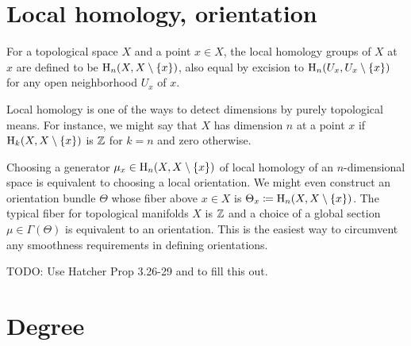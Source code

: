 \section{Local homology, orientation}

\begin{defn}
    For a topological space $X$ and a point $x\in X$, the local homology groups of $X$ at $x$ are defined to be $\mathrm{H}_n(X,X\setminus\{x\})$, also equal by excision to $\mathrm{H}_n(U_x,U_x\setminus\{x\})$ for any open neighborhood $U_x$ of $x$.
\end{defn}

\begin{rem}
    Local homology is one of the ways to detect dimensions by purely topological means. For instance, we might say that $X$ has dimension $n$ at a point $x$ if $\mathrm{H}_k(X,X\setminus\{x\})$ is $\mathbb{Z}$ for $k=n$ and zero otherwise.
    
    Choosing a generator $\mu_x\in \mathrm{H}_n(X,X\setminus\{x\}) $ of local homology of an $n$-dimensional space is equivalent to choosing a local orientation. We might even construct an orientation bundle $\Theta$ whose fiber above $x\in X$ is $\Theta_x\coloneqq \mathrm{H}_n(X,X\setminus\{x\})$. The typical fiber for topological manifolds $X$ is $\mathbb{Z}$ and a choice of a global section $\mu\in\Gamma(\Theta)$ is equivalent to an orientation. This is the easiest way to circumvent any smoothness requirements in defining orientations.
\end{rem}

TODO: Use Hatcher Prop 3.26-29 and  to fill this out.





\section{Degree}

